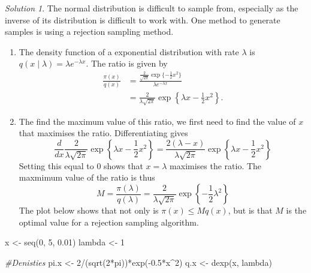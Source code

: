 \documentclass[
]{book}
\newenvironment{Shaded}{\begin{snugshade}}{\end{snugshade}}
\newcommand{\CommentTok}[1]{\textcolor[rgb]{0.56,0.35,0.01}{\textit{#1}}}
\newcommand{\DecValTok}[1]{\textcolor[rgb]{0.00,0.00,0.81}{#1}}
\newcommand{\FloatTok}[1]{\textcolor[rgb]{0.00,0.00,0.81}{#1}}
\newcommand{\FunctionTok}[1]{\textcolor[rgb]{0.00,0.00,0.00}{#1}}
\newcommand{\NormalTok}[1]{#1}
\newcommand{\OtherTok}[1]{\textcolor[rgb]{0.56,0.35,0.01}{#1}}
\newcommand{\SpecialCharTok}[1]{\textcolor[rgb]{0.00,0.00,0.00}{#1}}
\providecommand{\tightlist}{%
  \setlength{\itemsep}{0pt}\setlength{\parskip}{0pt}}
\theoremstyle{definition}
\theoremstyle{definition}
\theoremstyle{definition}
\theoremstyle{definition}
\theoremstyle{remark}
\newtheorem*{solution}{Solution}
\begin{document}
\begin{solution}

The normal distribution is difficult to sample from, especially as the inverse of its distribution is difficult to work with. One method to generate samples is using a rejection sampling method.

\begin{enumerate}
\def\labelenumi{\arabic{enumi}.}
\tightlist
\item
  The density function of a exponential distribution with rate \(\lambda\) is \(q(x \mid \lambda) = \lambda e^{-\lambda x}\). The ratio is given by
  \begin{align*}
  \frac{\pi(x)}{q(x)} &= \frac{\frac{2}{\sqrt{2\pi}}\exp\{-\frac{1}{2}x^2\}}{\lambda e^{-\lambda x}} \\
  & = \frac{2}{\lambda\sqrt{2\pi}}\exp\left\{\lambda x - \frac{1}{2}x^2\right\}.
  \end{align*}
\item
  The find the maximum value of this ratio, we first need to find the value of \(x\) that maximises the ratio. Differentiating gives
  \[
  \frac{d}{dx}\frac{2}{\lambda\sqrt{2\pi}}\exp\left\{\lambda x - \frac{1}{2}x^2 \right\} = \frac{2(\lambda - x)}{\lambda\sqrt{2\pi}}\exp\left\{\lambda x - \frac{1}{2}x^2 \right\}
  \]
  Setting this equal to 0 shows that \(x = \lambda\) maximises the ratio. The maxmimum value of the ratio is thus
  \[
  M = \frac{\pi(\lambda)}{q(\lambda)} = \frac{2}{\lambda\sqrt{2\pi}}\exp\left\{-\frac{1}{2}\lambda^2\right\}
  \]
  The plot below shows that not only is \(\pi(x) \leq Mq(x)\), but is that \(M\) is the optimal value for a rejection sampling algorithm.
\end{enumerate}

\begin{Shaded}
\begin{Highlighting}[]
\NormalTok{x }\OtherTok{\textless{}{-}} \FunctionTok{seq}\NormalTok{(}\DecValTok{0}\NormalTok{, }\DecValTok{5}\NormalTok{, }\FloatTok{0.01}\NormalTok{)}
\NormalTok{lambda }\OtherTok{\textless{}{-}} \DecValTok{1}

\CommentTok{\#Denisties}
\NormalTok{pi.x }\OtherTok{\textless{}{-}} \DecValTok{2}\SpecialCharTok{/}\NormalTok{(}\FunctionTok{sqrt}\NormalTok{(}\DecValTok{2}\SpecialCharTok{*}\NormalTok{pi))}\SpecialCharTok{*}\FunctionTok{exp}\NormalTok{(}\SpecialCharTok{{-}}\FloatTok{0.5}\SpecialCharTok{*}\NormalTok{x}\SpecialCharTok{\^{}}\DecValTok{2}\NormalTok{)}
\NormalTok{q.x  }\OtherTok{\textless{}{-}} \FunctionTok{dexp}\NormalTok{(x, lambda) }


\end{Highlighting}
\end{Shaded}
\end{solution}
\end{document}
